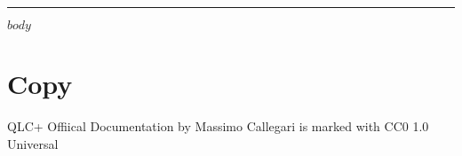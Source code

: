 \documentclass[12pt]{article}
\begin{document}
\begin{titlepage}
    \centering
    {\Huge \textbf{\inserttitle}\par}
    \vspace{0.5cm}
    {\Large \insertsubtitle\par}
    \vspace{1.5cm}
    {\Large \insertauthor\par}
    \vspace{0.5cm}
    {\Large \insertdate\par}
    \vfill
    \rule{0.8\textwidth}{0.4pt}\par
\end{titlepage}

\newpage

\newpage
\tableofcontents
\newpage

$body$


\section{Copy}
QLC+ Offiical Documentation by Massimo Callegari is marked with CC0 1.0 Universal
\end{document}
